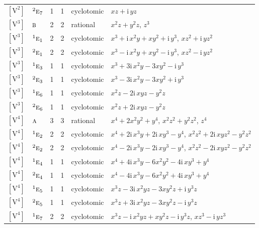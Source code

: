 \documentclass[10pt,a4paper]{article}
\numberwithin{equation}{section}
\newcommand{\irr}[1]{\text{\normalfont\scshape #1}}
\newcommand{\conjpair}[1]{{}^{#1}}
\newcommand{\iunit}{\mathrm{i}}
\newcommand{\jahn}[1]{\mathrm{#1}}
\newlength{\fillwidth}\newlength{\cellwidth}\newlength{\colwidth}
\begin{document}
{\begin{longtable}{@{}llrrl>{\RaggedRight\arraybackslash}p{\fillwidth}@{}}
$\jahn{[V^{2}]}$ & $\conjpair{2}\irr{e}_{7}$ & 1 & 1 & cyclotomic & $xz + \iunit{}\,yz$\\
$\jahn{[V^{3}]}$ & $\irr{b}$ & 2 & 2 & rational & $x^{2}z + y^{2}z$, $z^{3}$\\
$\jahn{[V^{3}]}$ & $\conjpair{1}\irr{e}_{1}$ & 2 & 2 & cyclotomic & $x^{3} + \iunit{}\,x^{2}y + xy^{2} + \iunit{}\,y^{3}$, $xz^{2} + \iunit{}\,yz^{2}$\\
$\jahn{[V^{3}]}$ & $\conjpair{2}\irr{e}_{1}$ & 2 & 2 & cyclotomic & $x^{3} - \iunit{}\,x^{2}y + xy^{2} - \iunit{}\,y^{3}$, $xz^{2} - \iunit{}\,yz^{2}$\\
$\jahn{[V^{3}]}$ & $\conjpair{1}\irr{e}_{3}$ & 1 & 1 & cyclotomic & $x^{3} + 3\iunit{}\,x^{2}y - 3xy^{2} - \iunit{}\,y^{3}$\\
$\jahn{[V^{3}]}$ & $\conjpair{2}\irr{e}_{3}$ & 1 & 1 & cyclotomic & $x^{3} - 3\iunit{}\,x^{2}y - 3xy^{2} + \iunit{}\,y^{3}$\\
$\jahn{[V^{3}]}$ & $\conjpair{1}\irr{e}_{6}$ & 1 & 1 & cyclotomic & $x^{2}z - 2\iunit{}\,xyz - y^{2}z$\\
$\jahn{[V^{3}]}$ & $\conjpair{2}\irr{e}_{6}$ & 1 & 1 & cyclotomic & $x^{2}z + 2\iunit{}\,xyz - y^{2}z$\\
$\jahn{[V^{4}]}$ & $\irr{a}$ & 3 & 3 & rational & $x^{4} + 2x^{2}y^{2} + y^{4}$, $x^{2}z^{2} + y^{2}z^{2}$, $z^{4}$\\
$\jahn{[V^{4}]}$ & $\conjpair{1}\irr{e}_{2}$ & 2 & 2 & cyclotomic & $x^{4} + 2\iunit{}\,x^{3}y + 2\iunit{}\,xy^{3} - y^{4}$, $x^{2}z^{2} + 2\iunit{}\,xyz^{2} - y^{2}z^{2}$\\
$\jahn{[V^{4}]}$ & $\conjpair{2}\irr{e}_{2}$ & 2 & 2 & cyclotomic & $x^{4} - 2\iunit{}\,x^{3}y - 2\iunit{}\,xy^{3} - y^{4}$, $x^{2}z^{2} - 2\iunit{}\,xyz^{2} - y^{2}z^{2}$\\
$\jahn{[V^{4}]}$ & $\conjpair{1}\irr{e}_{4}$ & 1 & 1 & cyclotomic & $x^{4} + 4\iunit{}\,x^{3}y - 6x^{2}y^{2} - 4\iunit{}\,xy^{3} + y^{4}$\\
$\jahn{[V^{4}]}$ & $\conjpair{2}\irr{e}_{4}$ & 1 & 1 & cyclotomic & $x^{4} - 4\iunit{}\,x^{3}y - 6x^{2}y^{2} + 4\iunit{}\,xy^{3} + y^{4}$\\
$\jahn{[V^{4}]}$ & $\conjpair{1}\irr{e}_{5}$ & 1 & 1 & cyclotomic & $x^{3}z - 3\iunit{}\,x^{2}yz - 3xy^{2}z + \iunit{}\,y^{3}z$\\
$\jahn{[V^{4}]}$ & $\conjpair{2}\irr{e}_{5}$ & 1 & 1 & cyclotomic & $x^{3}z + 3\iunit{}\,x^{2}yz - 3xy^{2}z - \iunit{}\,y^{3}z$\\
$\jahn{[V^{4}]}$ & $\conjpair{1}\irr{e}_{7}$ & 2 & 2 & cyclotomic & $x^{3}z - \iunit{}\,x^{2}yz + xy^{2}z - \iunit{}\,y^{3}z$, $xz^{3} - \iunit{}\,yz^{3}$\\

\end{longtable}}
\end{document}
